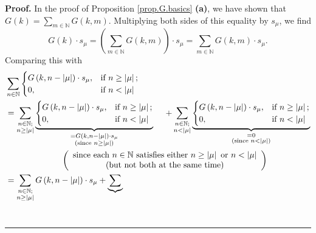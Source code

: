\documentclass[numbers=enddot,12pt,final,onecolumn,notitlepage]{scrartcl}%
\theoremstyle{definition}
\newenvironment{proof}[1][Proof]{\noindent\textbf{#1.} }{\ \rule{0.5em}{0.5em}}
\let\sumnonlimits\sum
\renewcommand{\sum}{\sumnonlimits\limits}
\newenvironment{verlong}{}{}
\begin{document}
\begin{verlong}
\begin{proof}
In the proof of Proposition \ref{prop.G.basics} \textbf{(a)}, we have shown
that $G\left(  k\right)  =\sum_{m\in\mathbb{N}}G\left(  k,m\right)  $.
Multiplying both sides of this equality by $s_{\mu}$, we find%
\[
G\left(  k\right)  \cdot s_{\mu}=\left(  \sum_{m\in\mathbb{N}}G\left(
k,m\right)  \right)  \cdot s_{\mu}=\sum_{m\in\mathbb{N}}G\left(  k,m\right)
\cdot s_{\mu}.
\]
Comparing this with%
\begin{align*}
&  \sum_{n\in\mathbb{N}}%
\begin{cases}
G\left(  k,n-\left\vert \mu\right\vert \right)  \cdot s_{\mu}, & \text{if
}n\geq\left\vert \mu\right\vert ;\\
0, & \text{if }n<\left\vert \mu\right\vert
\end{cases}
\\
&  =\sum_{\substack{n\in\mathbb{N};\\n\geq\left\vert \mu\right\vert
}}\underbrace{%
\begin{cases}
G\left(  k,n-\left\vert \mu\right\vert \right)  \cdot s_{\mu}, & \text{if
}n\geq\left\vert \mu\right\vert ;\\
0, & \text{if }n<\left\vert \mu\right\vert
\end{cases}
}_{\substack{=G\left(  k,n-\left\vert \mu\right\vert \right)  \cdot s_{\mu
}\\\text{(since }n\geq\left\vert \mu\right\vert \text{)}}}\ \ \ \ +\sum
_{\substack{n\in\mathbb{N};\\n<\left\vert \mu\right\vert }}\underbrace{%
\begin{cases}
G\left(  k,n-\left\vert \mu\right\vert \right)  \cdot s_{\mu}, & \text{if
}n\geq\left\vert \mu\right\vert ;\\
0, & \text{if }n<\left\vert \mu\right\vert
\end{cases}
}_{\substack{=0\\\text{(since }n<\left\vert \mu\right\vert \text{)}}}\\
&  \ \ \ \ \ \ \ \ \ \ \ \ \ \ \ \ \ \ \ \ \left(
\begin{array}
[c]{c}%
\text{since each }n\in\mathbb{N}\text{ satisfies either }n\geq\left\vert
\mu\right\vert \text{ or }n<\left\vert \mu\right\vert \\
\text{(but not both at the same time)}%
\end{array}
\right) \\
&  =\sum_{\substack{n\in\mathbb{N};\\n\geq\left\vert \mu\right\vert }}G\left(
k,n-\left\vert \mu\right\vert \right)  \cdot s_{\mu}+\underbrace{\sum
}
\end{align*}
\end{proof}
\end{verlong}
\end{document}
